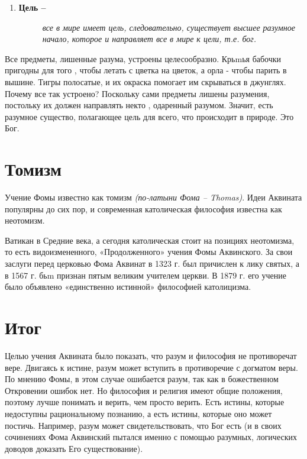 \begin{enumerate}
\def\labelenumi{\arabic{enumi}.}
\setcounter{enumi}{4}
\item
  \begin{description}
  \item[\textbf{Цель --}]
  \emph{все в мире имеет цель, следовательно, существует высшее разумное
  начало, которое и направляет все в мире к цели, т.е. бог.}
  \end{description}
\end{enumerate}

Все предметы, лишенные разума, устроены целесообразно. Крьmья бабочки
пригодны для того , чтобы летать с цветка на цветок, а орла - чтобы
парить в вышине. Тигры полосатые, и их окраска помогает им скрываться в
джунглях. Почему все так устроено? Поскольку сами предметы лишены
разумения, постольку их должен направлять некто , одаренный разумом.
Значит, есть разумное существо, полагающее цель для всего, что
происходит в природе. Это Бог.


\section{Томизм}

Учение Фомы известно как томизм \emph{(по-латыни Фома -- Thomas)}. Идеи
Аквината популярны до сих пор, и современная католическая философия
известна как неотомизм.

Ватикан в Средние века, а сегодня католическая
стоит на позициях неотомизма, то есть видоизмененного, «Продолженного»
учения Фомы Аквинского. За свои заслуги перед церковью Фома Аквинат в
1323 г. был причислен к лику святых, а в 1567
г. бьm признан пятым великим учителем церк­ви. В 1879 г. его учение было
объявлено «единственно истин­ной» философией католицизма.


\section{Итог}

Целью учения Аквината было показать, что разум и философия не
противоречат вере. Двигаясь к истине, разум может вступить в
противоречие с догматом веры. По мнению Фомы, в этом случае ошибается
разум, так как в божественном Откровении ошибок нет. Но философия и
религия имеют общие положения, поэтому лучше понимать и верить, чем
просто верить. Есть истины, которые недоступны рациональному познанию, а
есть истины, которые оно может постичь. Например, разум может
свидетельствовать, что Бог есть (и в своих сочинениях Фома Аквинский
пытался именно с помощью разумных, логических доводов доказать Его
существование).


